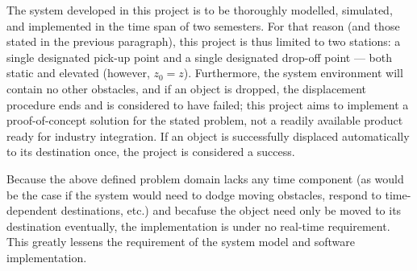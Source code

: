 The system developed in this project is to be thoroughly modelled, simulated, and implemented in the time span of two semesters.
For that reason (and those stated in the previous paragraph), this project is thus limited to two stations:
a single designated pick-up point and a single designated drop-off point  --- both static and elevated (however, $z_0 = z$).
Furthermore, the system environment will contain no other obstacles, and if an object is dropped, the displacement procedure ends and is considered to have failed;
this project aims to implement a proof-of-concept solution for the stated problem, not a readily available product ready for industry integration.
If an object is successfully displaced automatically to its destination once, the project is considered a success.

Because the above defined problem domain lacks any time component (as would be the case if the system would need to dodge moving obstacles, respond to time-dependent destinations, etc.) and becafuse the object need only be moved to its destination eventually, the implementation is under no real-time requirement.
This greatly lessens the requirement of the system model and software implementation.
